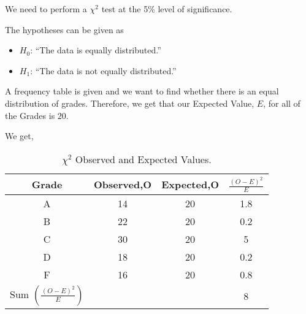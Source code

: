 %
%


\begin{subquestions}
	
\subquestion

We need to perform a $\chi^2$ test at the 5\% level of significance.

\begin{subsubquestions}
	
\subsubquestion

The hypotheses can be given as
\begin{itemize}
	\item $H_0$: ``The data is equally distributed.''
	
	\item $H_1$: ``The data is not equally distributed.''
\end{itemize}


\subsubquestion

A frequency table is given and we want to find whether there is an equal distribution of grades. Therefore, we get that our Expected Value, $E$, for all of the Grades is $20$.

We get,
\begin{table}[H]
	\centering
	\begin{tabular}{|c|c|c|c|}
		\hline
		Grade & Observed,O & Expected,O & $\frac{(O-E)^2}{E}$ \\
		\hline
		A & 14 & 20 & 1.8 \\
		B & 22 & 20 & 0.2 \\
		C & 30 & 20 & 5 \\ 
		D & 18 & 20 & 0.2 \\ 
		F & 16 & 20 & 0.8 \\
		\hline
		Sum $\left( \frac{(O-E)^2}{E} \right) $ & & & 8 \\
		\hline
	\end{tabular}
	\caption{\label{2016:q4:ChiTable} $\chi^2$ Observed and Expected Values.}
\end{table}
	

\end{subsubquestions}
\end{subquestions}
